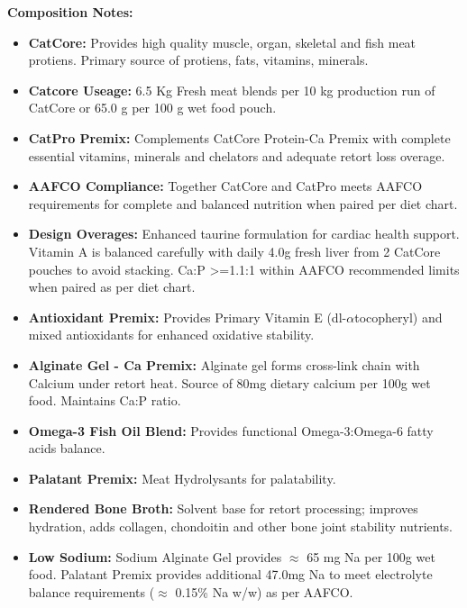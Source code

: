 \noindent\textbf{Composition Notes:}
\begin{itemize}
\item\textbf {CatCore: }Provides high quality muscle, organ, skeletal and fish meat protiens. Primary source of protiens, fats, vitamins, minerals. 
\item \textbf{Catcore Useage: }6.5 Kg Fresh meat blends per 10 kg production run of CatCore or 65.0 g per 100 g wet food pouch.
\item \textbf{CatPro Premix: } Complements CatCore Protein-Ca Premix with complete essential vitamins, minerals and chelators and adequate retort loss overage. 
\item\textbf{AAFCO Compliance: } Together CatCore and CatPro meets AAFCO requirements for complete and balanced nutrition when paired per diet chart. 
\item\textbf{Design Overages: }Enhanced taurine formulation for cardiac health support. Vitamin A is balanced carefully with daily 4.0g fresh liver from 2 CatCore pouches to avoid stacking. Ca:P >=1.1:1 within AAFCO recommended limits when paired as per diet chart. 
\item \textbf{Antioxidant Premix: } Provides Primary Vitamin E (dl-$\alpha$tocopheryl) and mixed antioxidants for enhanced oxidative stability.
\item \textbf{Alginate Gel - Ca Premix:} Alginate gel forms cross-link chain with Calcium under retort heat. Source of 80mg dietary calcium per 100g wet food. Maintains Ca:P ratio. 
\item \textbf{Omega-3 Fish Oil Blend:} Provides functional Omega-3:Omega-6 fatty acids balance. 
\item \textbf{Palatant Premix: } Meat Hydrolysants for palatability.
\item \textbf{Rendered Bone Broth: } Solvent base for retort processing; improves hydration, adds collagen, chondoitin and other bone joint stability nutrients. 
\item\textbf {Low Sodium:} Sodium Alginate Gel provides $\approx$ 65 mg Na per 100g wet food. Palatant Premix provides additional 47.0mg Na to meet electrolyte balance requirements ($\approx$ 0.15\% Na w/w) as per AAFCO. 
\end{itemize}


